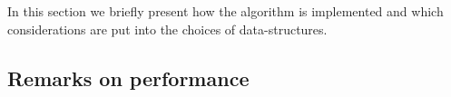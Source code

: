 In this section we briefly present how the algorithm is implemented and which considerations are put into the choices of data-structures.


\subsection{Remarks on performance}